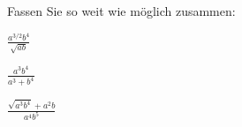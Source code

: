\item Fassen Sie so weit wie möglich zusammen:
\begin{enumerate}
\begin{multicols}{3}
\item
$\frac{a^{3/2}b^4}{\sqrt{ab}}$ 
\item
$\frac{a^3b^4}{a^3+b^4}$
\item
$\frac{\sqrt{a^3b^4}+a^2b}{a^4b^5}$
\end{multicols}
\end{enumerate}

